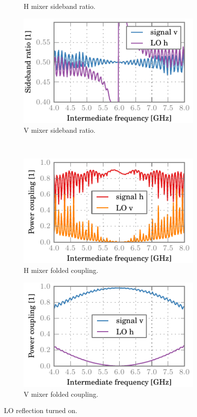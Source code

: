 \begin{figure}[hbtp]
\begin{subfigure}[b]{.5\textwidth}
        \caption{H mixer sideband ratio.}
    \end{subfigure}%
    \begin{subfigure}[b]{.5\textwidth}
        \includegraphics{chapter_3/12_lor_att00_v_sbr}%
        \caption{V mixer sideband ratio.}
    \end{subfigure}%
    \\
    \begin{subfigure}[b]{.5\textwidth}
        \includegraphics{chapter_3/12_lor_att00_h_ssb}%
        \caption{H mixer folded coupling.}
    \end{subfigure}%
    \begin{subfigure}[b]{.5\textwidth}
        \includegraphics{chapter_3/12_lor_att00_v_ssb}%
        \caption{V mixer folded coupling.}
    \end{subfigure}%
    \caption{LO reflection turned on.}
    \label{fig:12_lor_att00}
\end{figure}

